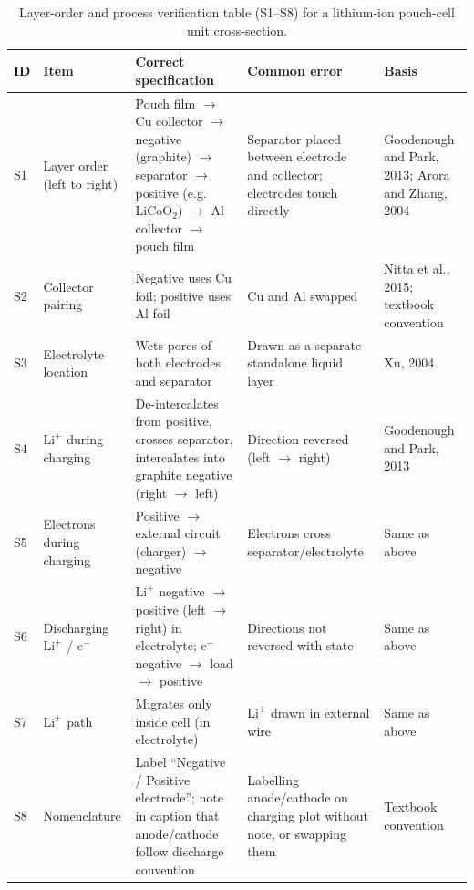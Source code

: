 \begin{table}[htbp]\centering\scriptsize
\setlength{\tabcolsep}{3pt}
\renewcommand{\arraystretch}{1.1}
\caption{Layer-order and process verification table (S1--S8) for a lithium-ion pouch-cell unit cross-section.}\label{tab:ch07-03}
\begin{tabularx}{\linewidth}{lYYYY}
\toprule
\textbf{ID} & \textbf{Item} & \textbf{Correct specification} & \textbf{Common error} & \textbf{Basis} \\
\midrule
S1 & Layer order (left to right) & Pouch film $\rightarrow$ Cu collector $\rightarrow$ negative (graphite) $\rightarrow$ separator $\rightarrow$ positive (e.g.\ $\text{LiCoO}_2$) $\rightarrow$ Al collector $\rightarrow$ pouch film & Separator placed between electrode and collector; electrodes touch directly & Goodenough and Park, 2013; Arora and Zhang, 2004 \\
S2 & Collector pairing & Negative uses Cu foil; positive uses Al foil & Cu and Al swapped & Nitta et al., 2015; textbook convention \\
S3 & Electrolyte location & Wets pores of both electrodes and separator & Drawn as a separate standalone liquid layer & Xu, 2004 \\
S4 & $\text{Li}^+$ during charging & De-intercalates from positive, crosses separator, intercalates into graphite negative (right $\rightarrow$ left) & Direction reversed (left $\rightarrow$ right) & Goodenough and Park, 2013 \\
S5 & Electrons during charging & Positive $\rightarrow$ external circuit (charger) $\rightarrow$ negative & Electrons cross separator/electrolyte & Same as above \\
S6 & Discharging $\text{Li}^+$ / $\text{e}^-$ & $\text{Li}^+$ negative $\rightarrow$ positive (left $\rightarrow$ right) in electrolyte; $\text{e}^-$ negative $\rightarrow$ load $\rightarrow$ positive & Directions not reversed with state & Same as above \\
S7 & $\text{Li}^+$ path & Migrates only inside cell (in electrolyte) & $\text{Li}^+$ drawn in external wire & Same as above \\
S8 & Nomenclature & Label ``Negative / Positive electrode''; note in caption that anode/cathode follow discharge convention & Labelling anode/cathode on charging plot without note, or swapping them & Textbook convention \\
\bottomrule
\end{tabularx}
\end{table}

